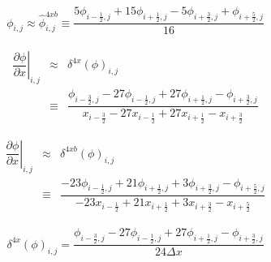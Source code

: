 \documentclass[gmd]{copernicus}
\begin{document}
\begin{eqnarray}
\phi_{i,j} \approx \widehat{\phi}^{4xb}_{i,j} \equiv \dfrac{ 5 \phi_{i-\frac{1}{2},j} + 15 \phi_{i+\frac{1}{2},j} - 5 \phi_{i+\frac{3}{2},j} + \phi_{i+\frac{5}{2},j}}{16}
\end{eqnarray}

\begin{eqnarray}
\nonumber
\left. \dfrac{\partial \phi}{\partial x}\right|_{i,j} & \approx & \delta^{4x} \left( \phi \right)_{i,j}\\
& \equiv & \dfrac{\phi_{i-\frac{3}{2},j} - 27 \phi_{i-\frac{1}{2},j} + 27 \phi_{i+\frac{1}{2},j} - \phi_{i+\frac{3}{2},j}}
             {       x_{i-\frac{3}{2}}   - 27    x_{i-\frac{1}{2}}   + 27    x_{i+\frac{1}{2}}   -    x_{i+\frac{3}{2}}}
\end{eqnarray}

\begin{eqnarray}
\nonumber
\left. \dfrac{\partial \phi}{\partial x}\right|_{i,j} & \approx & \delta^{4xb} \left( \phi \right)_{i,j}\\
& \equiv & \dfrac{-23 \phi_{i-\frac{1}{2},j} + 21 \phi_{i+\frac{1}{2},j} + 3 \phi_{i+\frac{3}{2},j} - \phi_{i+\frac{5}{2},j}}
                 {-23    x_{i-\frac{1}{2}}   + 21    x_{i+\frac{1}{2}}   + 3    x_{i+\frac{3}{2}}   -    x_{i+\frac{5}{2}}}
\end{eqnarray}

\begin{eqnarray}
\delta^{4x} \left( \phi \right)_{i,j}  = \dfrac{\phi_{i-\frac{3}{2},j} - 27 \phi_{i-\frac{1}{2},j} + 27 \phi_{i+\frac{1}{2},j} - \phi_{i+\frac{3}{2},j}}
                                               {24 \Delta x}
\end{eqnarray}
\end{document}
